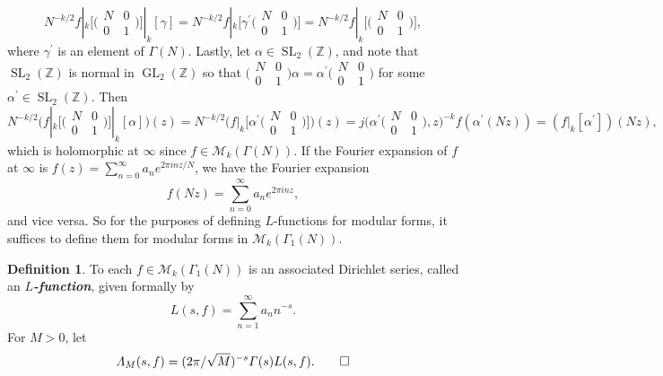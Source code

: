 \documentclass[10pt,leqno,twoside]{article}
\theoremstyle{plain}
\theoremstyle{definition}
\newtheorem{definition/}[lem]{Definition}
\newenvironment{definition}
  {\renewcommand{\qedsymbol}{\textdagger}%
   \pushQED{\qed}\begin{definition/}}
  {\popQED\end{definition/}}
\numberwithin{equation}{section}
\numberwithin{lem}{section}
\newcommand{\textib}[1]{\textbf{\textit{#1\index{#1}}}} %
\DeclareMathOperator{\GL}{GL}
\DeclareMathOperator{\SL}{SL}
\newcommand{\slz}{\SL_2(\mathbb{Z})}
\begin{document}
\[N^{-k/2}f|_k\big[\big(\!\begin{smallmatrix}
    N & 0 \\ 0 & 1
\end{smallmatrix}\!\big)\big]|_k[\gamma] = N^{-k/2}f|_k\big[\gamma^\prime\big(\!\begin{smallmatrix}
    N & 0 \\ 0 & 1
\end{smallmatrix}\!\big)\big] = N^{-k/2}f|_k\big[\big(\!\begin{smallmatrix}
    N & 0 \\ 0 & 1
\end{smallmatrix}\!\big)\big],\] where $\gamma^\prime$ is an element of $\varGamma(N)$. Lastly, let $\alpha\in \slz$, and note that $\slz$ is normal in $\GL_2(\mathbb Z)$ so that $\big(\!\begin{smallmatrix}
    N & 0 \\ 0 & 1
\end{smallmatrix}\!\big)\alpha = \alpha^\prime \big(\!\begin{smallmatrix}
    N & 0 \\ 0 & 1
\end{smallmatrix}\!\big)$ for some $\alpha^\prime\in\slz$. Then 
\[N^{-k/2}\Big(f|_k\big[\big(\!\begin{smallmatrix}
    N & 0 \\ 0 & 1
\end{smallmatrix}\!\big)\big]|_k[\alpha]\Big)(z) = N^{-k/2}\Big(f|_k\big[\alpha^\prime\big(\!\begin{smallmatrix}
    N & 0 \\ 0 & 1
\end{smallmatrix}\!\big)\big]\Big)(z) = j\big(\alpha^\prime\big(\!\begin{smallmatrix}
    N & 0 \\ 0 & 1
\end{smallmatrix}\!\big),z\big)^{-k}f(\alpha^\prime(Nz)) = (f|_k[\alpha^\prime])(Nz),\] which is holomorphic at $\infty$ since $f\in\mathcal M_k(\varGamma(N))$. If the Fourier expansion of $f$ at $\infty$ is $f(z) = \sum_{n =0}^\infty a_ne^{2\pi i n z/N}$, we have the Fourier expansion
\[f(Nz) = \sum_{n =0}^\infty a_ne^{2\pi i n z},\] and vice versa. So for the purposes of defining $L$-functions for modular forms, it suffices to define them for modular forms in $\mathcal M_k(\varGamma_1(N))$.
\begin{definition}\label{def: L function}
    To each $f\in\mathcal M_k(\varGamma_1(N))$ is an associated Dirichlet series, called an \textib{$L$-function}, given formally by
    \[L(s,f) = \sum_{n=1}^\infty a_nn^{-s}.\] For $M>0$, let 
    \[\varLambda_M(s,f) = (2\pi/\sqrt{M})^{-s}\varGamma(s)L(s,f).\qedhere\]
\end{definition}
\end{document}
